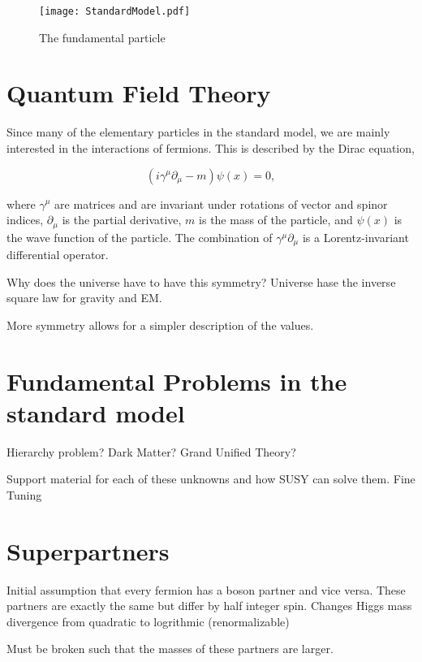 \begin{figure}
 	\centering
	\texttt{[image: StandardModel.pdf]}
 	\caption{The fundamental particle}
 	\label{SMParticles} 
\end{figure}
 
 \section{Quantum Field Theory}
 \label{QFT}
 
 Since many of the elementary particles in the standard model, we are mainly interested in the interactions of fermions. This is described by the Dirac equation, 
 
\begin{equation}
(i\gamma^\mu\partial_\mu-m)\psi(x)=0\label{Dirac},
\end{equation}

where $\gamma^\mu$ are matrices and are invariant under rotations of vector and spinor indices, $\partial_\mu$ is the partial derivative, $m$ is the mass of the particle, and $\psi(x)$ is the wave function of the particle. The combination of $\gamma^\mu\partial_\mu$ is a Lorentz-invariant differential operator. 
 

Why does the universe have to have this symmetry?
Universe hase the inverse square law for gravity and EM.

More symmetry allows for a simpler description of the values. 

\section{Fundamental Problems in the standard model}
\label{sec:Hierarchy}

Hierarchy problem?
Dark Matter?
Grand Unified Theory?

Support material for each of these unknowns and how SUSY can solve them. Fine Tuning

\section{Superpartners}
\label{sec:superpartners}

Initial assumption that every fermion has a boson partner and vice versa. These partners are exactly the same but differ by half integer spin. Changes Higgs mass divergence from quadratic to logrithmic (renormalizable)

Must be broken such that the masses of these partners are larger.

